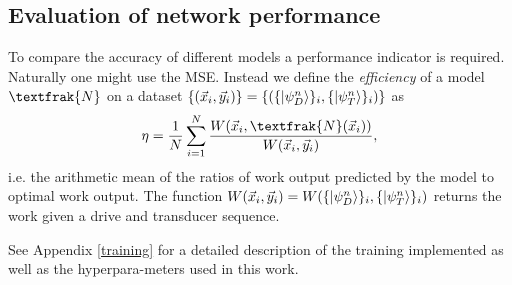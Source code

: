 \subsection{Evaluation of network performance}
To compare the accuracy of different models a performance indicator is required. 
Naturally one might use the MSE.
Instead we define the \textit{efficiency} of a model $\textfrak{N}$ on a dataset $\{(\vec{x}_i, \vec{y}_i)\} = \{(\{\ket{\psi_D^n}\}_i, \{\ket{\psi_T^n}\}_i) \}$ as
\begin{align}
	\eta = \frac{1}{N} \sum_{i=1}^N \frac{W(\vec{x}_i,\textfrak{N}(\vec{x}_i))}{W(\vec{x}_i,\vec{y}_i)},
\end{align}
i.e. the arithmetic mean of the ratios of work output predicted by the model to optimal work output.
The function $W(\vec{x}_i, \vec{y}_i) = W(\{\ket{\psi_D^n}\}_i, \{\ket{\psi_T^n}\}_i)$ returns the work given a drive and transducer sequence.

See Appendix \ref{training} for a detailed description of the training implemented as well as the hyperpara-meters used in this work.